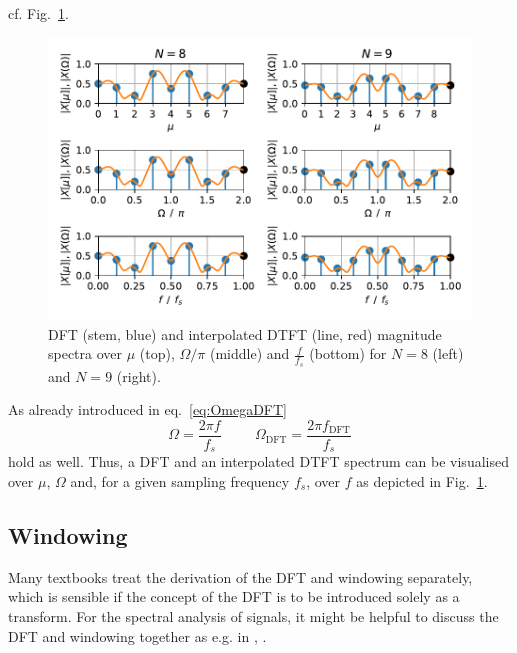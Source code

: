 \documentclass[11pt,a4paper,DIV=12]{scrartcl}
\begin{document}
cf. Fig.~\ref{DTFT_Interpolation}.
%
\begin{figure}
		\centering
		\includegraphics[]{graphics/DTFT_Interpolation.pdf}
		\caption{DFT (stem, blue) and interpolated DTFT (line, red) magnitude
		spectra over $\mu$ (top), $\Omega/\pi$ (middle) and $\frac{f}{f_s}$ (bottom)
		for $N=8$ (left) and $N=9$ (right).}
		\label{DTFT_Interpolation}
\end{figure}
%
As already introduced in eq.~\eqref{eq:OmegaDFT}
%
\begin{equation}
\Omega=\frac{2\pi f}{f_s} \hspace{1cm} \Omega_\text{DFT}=\frac{2\pi f_\text{DFT}}{f_s}
\end{equation}
hold as well.
%
Thus, a DFT and an interpolated DTFT spectrum can be visualised over $\mu$,
$\Omega$ and, for a given sampling frequency $f_s$, over $f$ as depicted in
Fig.~\ref{DTFT_Interpolation}.

\subsection{Windowing}
Many textbooks treat the derivation of the DFT and windowing separately, which
is sensible if the concept of the DFT is to be introduced solely as a transform.
%
For the spectral analysis of signals, it might be helpful to discuss the DFT
and windowing together as e.g. in \cite{Moeser2011},
\cite[Ch.~7.3,~7.4]{Kammeyer2002}.
\end{document}
